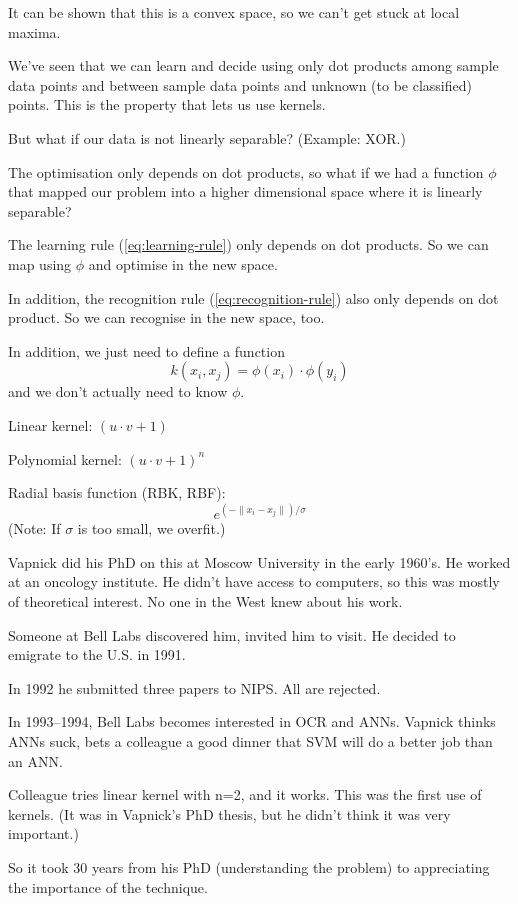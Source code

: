 It can be shown that this is a convex space, so we can't get stuck at
local maxima.

We've seen that we can learn and decide using only dot products among
sample data points and between sample data points and unknown (to be
classified) points.  This is the property that lets us use kernels.



But what if our data is not linearly separable?  (Example: XOR.)

The optimisation only depends on dot products, so what if we had a
function $\phi$ that mapped our problem into a higher dimensional
space where it is linearly separable?

The learning rule (\ref{eq:learning-rule}) only depends on dot
products.  So we can map using $\phi$ and optimise in the new space.

In addition, the recognition rule (\ref{eq:recognition-rule}) also
only depends on dot product.  So we can recognise in the new space,
too.

In addition, we just need to define a function
\begin{displaymath}
  k(x_i, x_j) = \phi(x_i)\cdot\phi(y_i)
\end{displaymath}
and we don't actually need to know $\phi$.




Linear kernel:
$(u\cdot v + 1)$

Polynomial kernel:
$(u\cdot v + 1)^n$

Radial basis function (RBK, RBF):
\begin{displaymath}
  e^{(-\parallel x_i - x_j\parallel) / \sigma}
\end{displaymath}
(Note: If $\sigma$ is too small, we overfit.)



Vapnick did his PhD on this at Moscow University in the early 1960's.
He worked at an oncology institute.  He didn't have access to
computers, so this was mostly of theoretical interest.  No one in the
West knew about his work.

Someone at Bell Labs discovered him, invited him to visit.  He decided
to emigrate to the U.S. in 1991.

In 1992 he submitted three papers to NIPS.  All are rejected.

In 1993--1994, Bell Labs becomes interested in OCR and ANNs.  Vapnick
thinks ANNs suck, bets a colleague a good dinner that SVM will do a
better job than an ANN.

Colleague tries linear kernel with n=2, and it works.  This was the
first use of kernels.  (It was in Vapnick's PhD thesis, but he didn't
think it was very important.)

So it took 30 years from his PhD (understanding the problem) to
appreciating the importance of the technique.





